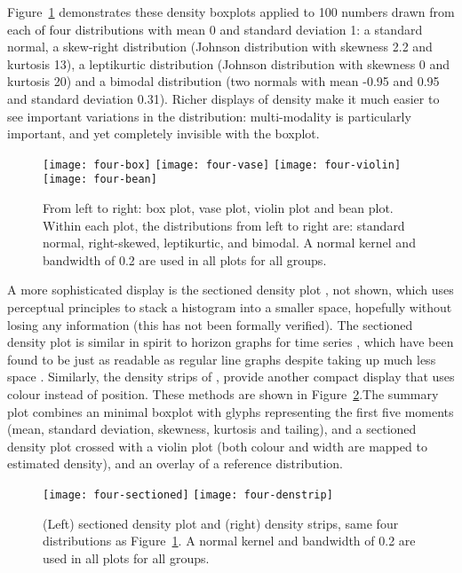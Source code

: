 \documentclass[oneside]{article}
\begin{document}
Figure~\ref{fig:density} demonstrates these density boxplots applied to 100 numbers drawn from each of four distributions with mean 0 and standard deviation 1: a standard normal, a skew-right distribution (Johnson distribution with skewness 2.2 and kurtosis 13), a leptikurtic distribution (Johnson distribution with skewness 0 and kurtosis 20) and a bimodal distribution (two normals with mean -0.95 and 0.95 and standard deviation 0.31). Richer displays of density make it much easier to see important variations in the distribution: multi-modality is particularly important, and yet completely invisible with the boxplot.

\begin{figure}[htbp]
  \centering
  \texttt{[image: four-box]}%
  \texttt{[image: four-vase]}%
  \texttt{[image: four-violin]}%
  \texttt{[image: four-bean]}
  \caption{From left to right: box plot, vase plot, violin plot and bean plot.  
Within each plot, the distributions from left to right are: standard normal, right-skewed, leptikurtic, and bimodal. A normal kernel and bandwidth of 0.2 are used in all plots for all groups.}
  \label{fig:density}
\end{figure}

A more sophisticated display is the sectioned density plot \citep{cohen:2006}, not shown, which uses perceptual principles to stack a histogram into a smaller space, hopefully without losing any information (this has not been formally verified). The sectioned density plot is similar in spirit to horizon graphs for time series \citep{reijner:2008}, which have been found to be just as readable as regular line graphs despite taking up much less space \citep{heer:2009}. Similarly, the density strips of \citet{jackson:2008}, provide another compact display that uses colour instead of position. These methods are shown in Figure~\ref{fig:density-display}.The summary plot \citep{potter:2010} combines an minimal boxplot with glyphs representing the first five moments (mean, standard deviation, skewness, kurtosis and tailing), and a sectioned density plot crossed with a violin plot (both colour and width are mapped to estimated density), and an overlay of a reference distribution.

\begin{figure}[htbp]
  \centering
  \texttt{[image: four-sectioned]}%
  \texttt{[image: four-denstrip]}
  \caption{(Left) sectioned density plot and (right) density strips, same four distributions as Figure~\ref{fig:density}. A normal kernel and bandwidth of 0.2 are used in all plots for all groups.}
  \label{fig:density-display}
\end{figure}
\end{document}
